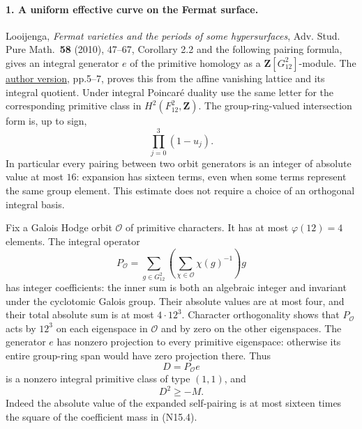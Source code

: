\paragraph{1. A uniform effective curve on the Fermat surface.}
Looijenga, \emph{Fermat varieties and the periods of some
hypersurfaces}, Adv. Stud. Pure Math.\ \textbf{58} (2010),
47--67, Corollary 2.2 and the following pairing formula,
gives an integral generator $e$ of the primitive homology
as a $\mathbf Z[G_{12}^2]$-module.  The
\href{https://webspace.science.uu.nl/~looij101/fermatperiod4.pdf}
{author version}, pp.5--7, proves this from the affine
vanishing lattice and its integral quotient.  Under integral
Poincar\'e duality use the same letter for the corresponding
primitive class in $H^2(F_{12}^2,\mathbf Z)$.
The group-ring-valued intersection form is, up to sign,
\[
                         \prod_{j=0}^3(1-u_j).
\]
In particular every pairing between two orbit generators is
an integer of absolute value at most $16$: expansion has
sixteen terms, even when some terms represent the same group
element.  This estimate does not require a choice of an
orthogonal integral basis.

Fix a Galois Hodge orbit $\mathcal O$ of primitive characters.
It has at most $\varphi(12)=4$ elements.  The integral operator
\[
 P_{\mathcal O}
  =\sum_{g\in G_{12}^2}
       \left(\sum_{\chi\in\mathcal O}\chi(g)^{-1}\right)g
                                                        \tag{N15.4}
\]
has integer coefficients: the inner sum is both an algebraic
integer and invariant under the cyclotomic Galois group.
Their absolute values are at most four, and their total
absolute sum is at most $4\cdot12^3$.
Character orthogonality shows that $P_{\mathcal O}$ acts by
$12^3$ on each eigenspace in $\mathcal O$ and by zero on
the other eigenspaces.  The generator $e$ has nonzero projection
to every primitive eigenspace: otherwise its entire group-ring
span would have zero projection there.  Thus
\[
                D=P_{\mathcal O}e
\]
is a nonzero integral primitive class of type $(1,1)$, and
\[
                         D^2\geq-M.                    \tag{N15.5}
\]
Indeed the absolute value of the expanded self-pairing is
at most sixteen times the square of the coefficient mass
in (N15.4).

